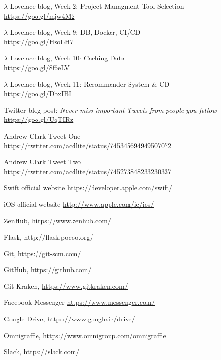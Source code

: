 \documentclass{article}
\begin{document}
\begin{thebibliography}{9}
	$\lambda$ Lovelace blog, Week 2: Project Managment Tool Selection \\ \url{https://goo.gl/mjw4M2}
	
	$\lambda$ Lovelace blog, Week 9: DB, Docker, CI/CD \\ 
	\phantom{ } \url{https://goo.gl/HzoLH7}
	
	$\lambda$ Lovelace blog, Week 10: Caching Data \\ 
	\phantom{ } \url{https://goo.gl/8f6eLV}
	
	$\lambda$ Lovelace blog, Week 11: Recommender System \& CD \\ 
	\phantom{ } \url{https://goo.gl/DbxIBI}
	
    Twitter blog post: \textit{Never miss important Tweets from people you follow} \\
    \phantom{ } \url{https://goo.gl/UqTIRz}

    Andrew Clark Tweet One \\
    \phantom{ } \url{https://twitter.com/acdlite/status/745345694949507072}
    
    Andrew Clark Tweet Two \\
    \phantom{ } \url{https://twitter.com/acdlite/status/745273848233230337}
	
	Swift official website \url{https://developer.apple.com/swift/}
	
	iOS official website \url{http://www.apple.com/ie/ios/}
	
	ZenHub, \url{https://www.zenhub.com/}

    Flask, \url{http://flask.pocoo.org/}
    
    Git, \url{https://git-scm.com/}

    GitHub, \url{https://github.com/}

    Git Kraken, \url{https://www.gitkraken.com/}

    Facebook Messenger \url{https://www.messenger.com/}

    Google Drive, \url{https://www.google.ie/drive/}

    Omnigraffle, \url{https://www.omnigroup.com/omnigraffle}

    Slack, \url{https://slack.com/}
    

\end{thebibliography}
\end{document}
